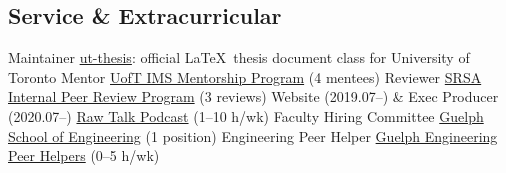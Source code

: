 \subsection{Service \& Extracurricular}
  {Maintainer}
  {\href{https://www.ctan.org/pkg/ut-thesis}{ut-thesis}: official \LaTeX\ thesis document class for University of Toronto}
  {Mentor} %
  {\href{https://ims.utoronto.ca/ims-p2p-mentorship}{UofT IMS Mentorship Program} (4 mentees)}
  {Reviewer} %
  {\href{https://research.unityhealth.to/future-students-trainees/st-michaels-hospital-research-student-association}{SRSA Internal Peer Review Program} (3 reviews)}
  {Website \textnormal{(2019.07--)} \& Exec Producer \textnormal{(2020.07--)}}
  {\href{https://www.rawtalkpodcast.com}{Raw Talk Podcast} (1--10 h/wk)}
  {Faculty Hiring Committee}
  {\href{https://www.uoguelph.ca/engineering}{Guelph School of Engineering} (1 position)}
  {Engineering Peer Helper}
  {\href{https://www.uoguelph.ca/engineering/content/current/peer-helper}{Guelph Engineering Peer Helpers} (0--5 h/wk)}
